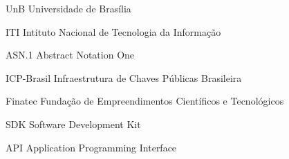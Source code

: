 \begin{siglas}
  \item [UnB] Universidade de Brasília
  \item [ITI] Intituto Nacional de Tecnologia da Informação
  \item [ASN.1] Abstract Notation One
  \item [ICP-Brasil] Infraestrutura de Chaves Públicas Brasileira
  \item [Finatec] Fundação de Empreendimentos Científicos e Tecnológicos
  \item [SDK] Software Development Kit
  \item [API] Application Programming Interface
\end{siglas}
